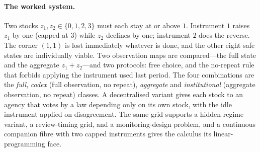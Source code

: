 \paragraph{The worked system.}
Two stocks $z_1,z_2\in\{0,1,2,3\}$ must each stay at or above $1$. Instrument $1$ raises $z_1$ by one (capped at $3$) while $z_2$ declines by one; instrument $2$ does the reverse. The corner $(1,1)$ is lost immediately whatever is done, and the other eight safe states are individually viable. Two observation maps are compared---the full state and the aggregate $z_1+z_2$---and two protocols: free choice, and the no-repeat rule that forbids applying the instrument used last period. The four combinations are the \emph{full}, \emph{codex} (full observation, no repeat), \emph{aggregate} and \emph{institutional} (aggregate observation, no repeat) classes. A decentralised variant gives each stock to an agency that votes by a law depending only on its own stock, with the idle instrument applied on disagreement. The same grid supports a hidden-regime variant, a review-timing grid, and a monitoring-design problem, and a continuous companion fibre with two capped instruments gives the calculus its linear-programming face.

